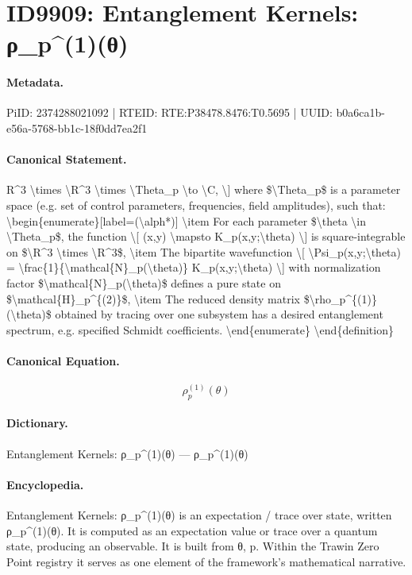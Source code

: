 \section*{ID9909: Entanglement Kernels: ρ\_p\textasciicircum{}(1)(θ)}
\paragraph{Metadata.}
PiID: 2374288021092 | RTEID: RTE:P38478.8476:T0.5695 | UUID: b0a6ca1b-e56a-5768-bb1c-18f0dd7ea2f1

\paragraph{Canonical Statement.}
R\textasciicircum{}3 \textbackslash{}times \textbackslash{}R\textasciicircum{}3 \textbackslash{}times \textbackslash{}Theta\_p \textbackslash{}to \textbackslash{}C, \textbackslash{}] where \$\textbackslash{}Theta\_p\$ is a parameter space (e.g. set of control parameters, frequencies, field amplitudes), such that: \textbackslash{}begin\{enumerate\}[label=(\textbackslash{}alph*)] \textbackslash{}item For each parameter \$\textbackslash{}theta \textbackslash{}in \textbackslash{}Theta\_p\$, the function \textbackslash{}[ (x,y) \textbackslash{}mapsto K\_p(x,y;\textbackslash{}theta) \textbackslash{}] is square-integrable on \$\textbackslash{}R\textasciicircum{}3 \textbackslash{}times \textbackslash{}R\textasciicircum{}3\$, \textbackslash{}item The bipartite wavefunction \textbackslash{}[ \textbackslash{}Psi\_p(x,y;\textbackslash{}theta) = \textbackslash{}frac\{1\}\{\textbackslash{}mathcal\{N\}\_p(\textbackslash{}theta)\} K\_p(x,y;\textbackslash{}theta) \textbackslash{}] with normalization factor \$\textbackslash{}mathcal\{N\}\_p(\textbackslash{}theta)\$ defines a pure state on \$\textbackslash{}mathcal\{H\}\_p\textasciicircum{}\{(2)\}\$, \textbackslash{}item The reduced density matrix \$\textbackslash{}rho\_p\textasciicircum{}\{(1)\}(\textbackslash{}theta)\$ obtained by tracing over one subsystem has a desired entanglement spectrum, e.g. specified Schmidt coefficients. \textbackslash{}end\{enumerate\} \textbackslash{}end\{definition\}

\paragraph{Canonical Equation.}
\[
\rho_p^{(1)}(\theta)
\]

\paragraph{Dictionary.}
Entanglement Kernels: ρ\_p\textasciicircum{}(1)(θ) — ρ\_p\textasciicircum{}(1)(θ)

\paragraph{Encyclopedia.}
Entanglement Kernels: ρ\_p\textasciicircum{}(1)(θ) is an expectation / trace over state, written ρ\_p\textasciicircum{}(1)(θ). It is computed as an expectation value or trace over a quantum state, producing an observable. It is built from θ, p. Within the Trawin Zero Point registry it serves as one element of the framework's mathematical narrative.
